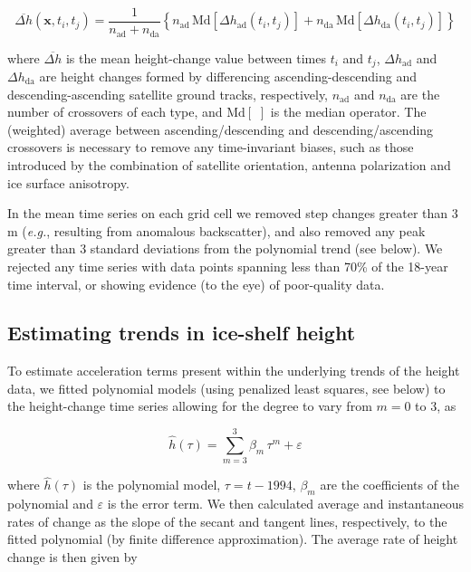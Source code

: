 \begin{equation}
  \overbar{\Delta h}(\mathbf{x}, t_i, t_j) = \frac{1}{n_\text{ad} + n_\text{da}} 
  \left\{
  n_\text{ad} \, \text{Md}\!\left[ \Delta h_\text{ad}(t_i, t_j) \right] +
  n_\text{da} \, \text{Md}\!\left[ \Delta h_\text{da}(t_i, t_j) \right]
  \right\}
\end{equation}

where $\overbar{\Delta h}$ is the mean height-change value between times $t_i$
and $t_j$, $\Delta h_\text{ad}$ and $\Delta h_\text{da}$ are height changes
formed by differencing ascending-descending and descending-ascending satellite
ground tracks, respectively, $n_\text{ad}$ and $n_\text{da}$ are the number of
crossovers of each type, and $\text{Md}[\,\,]$ is the median operator. The
(weighted) average between ascending/descending and descending/ascending
crossovers is necessary to remove any time-invariant biases, such as those
introduced by the combination of satellite orientation, antenna polarization
and ice surface anisotropy.

In the mean time series on each grid cell we removed step changes greater than
3 m ({\it e.g.}, resulting from anomalous backscatter), and also removed any peak
greater than 3 standard deviations from the polynomial trend (see below). We
rejected any time series with data points spanning less than 70\% of the
18-year time interval, or showing evidence (to the eye) of poor-quality data.

\subsection*{Estimating trends in ice-shelf height}

To estimate acceleration terms present within the underlying trends of the
height data, we fitted polynomial models (using penalized least squares, see
below) to the height-change time series allowing for the degree to vary from
$m = 0$ to 3, as

\begin{equation}
  \hat h(\tau) = \sum^3_{m=3} \beta_m \, \tau^m + \varepsilon
\end{equation}

where $\hat{h}(\tau)$ is the polynomial model, $\tau = t - 1994$, $\beta_m$
are the coefficients of the polynomial and $\varepsilon$ is the error term. We
then calculated average and instantaneous rates of change as the slope of the
secant and tangent lines, respectively, to the fitted polynomial (by finite
difference approximation). The average rate of height change is then given by

